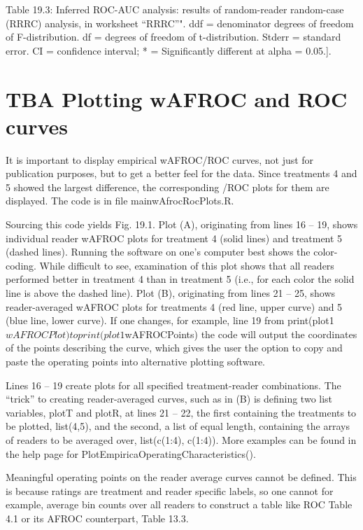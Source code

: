 \documentclass[
]{book}
\begin{document}
Table 19.3: Inferred ROC-AUC analysis: results of random-reader random-case (RRRC) analysis, in worksheet ``RRRC''". ddf = denominator degrees of freedom of F-distribution. df = degrees of freedom of t-distribution. Stderr = standard error. CI = confidence interval; * = Significantly different at alpha = 0.05.{]}.

\hypertarget{analyzing-froc-data-plotting}{%
\section{TBA Plotting wAFROC and ROC curves}\label{analyzing-froc-data-plotting}}

It is important to display empirical wAFROC/ROC curves, not just for publication purposes, but to get a better feel for the data. Since treatments 4 and 5 showed the largest difference, the corresponding /ROC plots for them are displayed. The code is in file mainwAfrocRocPlots.R.

Sourcing this code yields Fig. 19.1. Plot (A), originating from lines 16 -- 19, shows individual reader wAFROC plots for treatment 4 (solid lines) and treatment 5 (dashed lines). Running the software on one's computer best shows the color-coding. While difficult to see, examination of this plot shows that all readers performed better in treatment 4 than in treatment 5 (i.e., for each color the solid line is above the dashed line). Plot (B), originating from lines 21 -- 25, shows reader-averaged wAFROC plots for treatments 4 (red line, upper curve) and 5 (blue line, lower curve). If one changes, for example, line 19 from print(plot1\(wAFROCPlot) to print(plot1\)wAFROCPoints) the code will output the coordinates of the points describing the curve, which gives the user the option to copy and paste the operating points into alternative plotting software.

Lines 16 -- 19 create plots for all specified treatment-reader combinations. The ``trick'' to creating reader-averaged curves, such as in (B) is defining two list variables, plotT and plotR, at lines 21 -- 22, the first containing the treatments to be plotted, list(4,5), and the second, a list of equal length, containing the arrays of readers to be averaged over, list(c(1:4), c(1:4)). More examples can be found in the help page for PlotEmpiricaOperatingCharacteristics().

Meaningful operating points on the reader average curves cannot be defined. This is because ratings are treatment and reader specific labels, so one cannot for example, average bin counts over all readers to construct a table like ROC Table 4.1 or its AFROC counterpart, Table 13.3.
\end{document}
